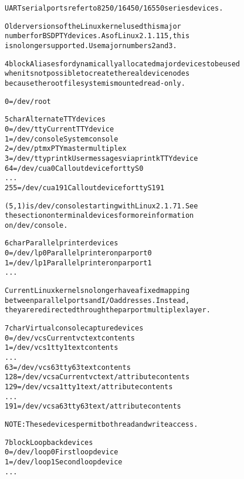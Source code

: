 \documentclass[a4paper,8pt,english]{sphinxmanual}
\begin{document}
\begin{alltt}
                UART serial ports refer to 8250/16450/16550 series devices.

                Older versions of the Linux kernel used this major
                number for BSD PTY devices.  As of Linux 2.1.115, this
                is no longer supported.  Use major numbers 2 and 3.

   4 block      Aliases for dynamically allocated major devices to be used
                when its not possible to create the real device nodes
                because the root filesystem is mounted read-only.

                   0 = /dev/root

   5 char       Alternate TTY devices
                  0 = /dev/tty          Current TTY device
                  1 = /dev/console      System console
                  2 = /dev/ptmx         PTY master multiplex
                  3 = /dev/ttyprintk    User messages via printk TTY device
                 64 = /dev/cua0         Callout device for ttyS0
                    ...
                255 = /dev/cua191       Callout device for ttyS191

                (5,1) is /dev/console starting with Linux 2.1.71.  See
                the section on terminal devices for more information
                on /dev/console.

   6 char       Parallel printer devices
                  0 = /dev/lp0          Parallel printer on parport0
                  1 = /dev/lp1          Parallel printer on parport1
                    ...

                Current Linux kernels no longer have a fixed mapping
                between parallel ports and I/O addresses.  Instead,
                they are redirected through the parport multiplex layer.

   7 char       Virtual console capture devices
                  0 = /dev/vcs          Current vc text contents
                  1 = /dev/vcs1         tty1 text contents
                    ...
                 63 = /dev/vcs63        tty63 text contents
                128 = /dev/vcsa         Current vc text/attribute contents
                129 = /dev/vcsa1        tty1 text/attribute contents
                    ...
                191 = /dev/vcsa63       tty63 text/attribute contents

                NOTE: These devices permit both read and write access.

   7 block      Loopback devices
                  0 = /dev/loop0        First loop device
                  1 = /dev/loop1        Second loop device
                    ...


\end{alltt}
\end{document}
